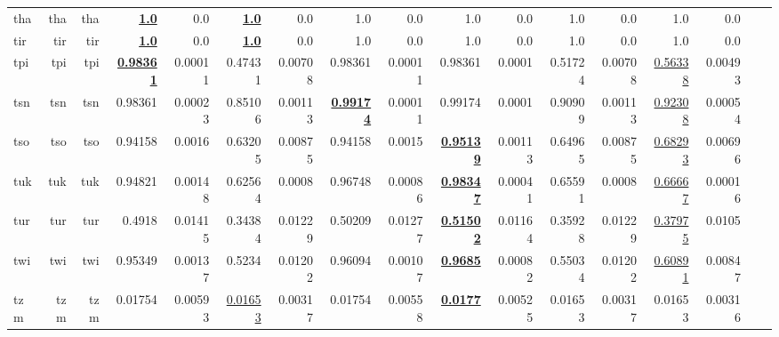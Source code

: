 \documentclass[11pt]{article}
\begin{document}
\begin{table*}[h]
{\begin{tabular}{lrrrrrrrrrrrrrrrr}
tha         & tha         & tha         & \textbf{\underline{1.0}}         & 0.0         & \textbf{\underline{1.0}}         & 0.0         & 1.0         & 0.0         & 1.0         & 0.0         & 1.0         & 0.0         & 1.0         & 0.0         \\
tir         & tir         & tir         & \textbf{\underline{1.0}}         & 0.0         & \textbf{\underline{1.0}}         & 0.0         & 1.0         & 0.0         & 1.0         & 0.0         & 1.0         & 0.0         & 1.0         & 0.0         \\
tpi         & tpi         & tpi         & \textbf{\underline{0.98361}}         & 0.00011         & 0.47431         & 0.00708         & 0.98361         & 0.00011         & 0.98361         & 0.0001         & 0.51724         & 0.00708         & \underline{0.56338}         & 0.00493         \\
tsn         & tsn         & tsn         & 0.98361         & 0.00023         & 0.85106         & 0.00113         & \textbf{\underline{0.99174}}         & 0.00011         & 0.99174         & 0.0001         & 0.90909         & 0.00113         & \underline{0.92308}         & 0.00054         \\
tso         & tso         & tso         & 0.94158         & 0.0016         & 0.63205         & 0.00875         & 0.94158         & 0.0015         & \textbf{\underline{0.95139}}         & 0.00113         & 0.64965         & 0.00875         & \underline{0.68293}         & 0.00696         \\
tuk         & tuk         & tuk         & 0.94821         & 0.00148         & 0.62564         & 0.0008         & 0.96748         & 0.00086         & \textbf{\underline{0.98347}}         & 0.00041         & 0.65591         & 0.0008         & \underline{0.66667}         & 0.00016         \\
tur         & tur         & tur         & 0.4918         & 0.01415         & 0.34384         & 0.01229         & 0.50209         & 0.01277         & \textbf{\underline{0.51502}}         & 0.01164         & 0.35928         & 0.01229         & \underline{0.37975}         & 0.0105         \\
twi         & twi         & twi         & 0.95349         & 0.00137         & 0.5234         & 0.01202         & 0.96094         & 0.00107         & \textbf{\underline{0.9685}}         & 0.00082         & 0.55034         & 0.01202         & \underline{0.60891}         & 0.00847         \\
tzm         & tzm         & tzm         & 0.01754         & 0.00593         & \underline{0.01653}         & 0.00317         & 0.01754         & 0.00558         & \textbf{\underline{0.0177}}         & 0.00525         & 0.01653         & 0.00317         & 0.01653         & 0.00316         \\

\end{tabular}}
\end{table*}
\end{document}
